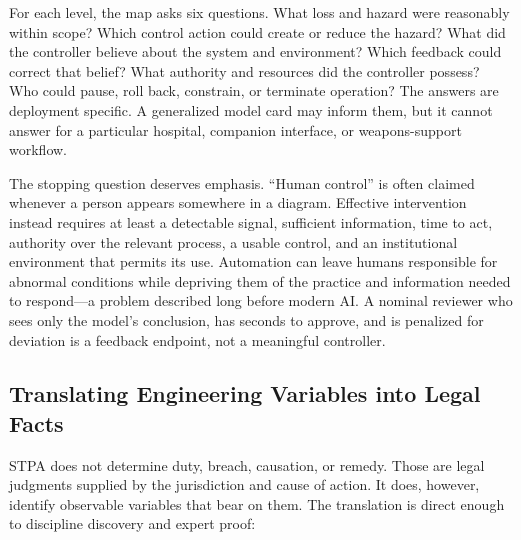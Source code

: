 For each level, the map asks six questions. What loss and hazard were reasonably within scope? Which control action could create or reduce the hazard? What did the controller believe about the system and environment? Which feedback could correct that belief? What authority and resources did the controller possess? Who could pause, roll back, constrain, or terminate operation? The answers are deployment specific. A generalized model card may inform them, but it cannot answer for a particular hospital, companion interface, or weapons-support workflow.

The stopping question deserves emphasis. ``Human control'' is often claimed whenever a person appears somewhere in a diagram. Effective intervention instead requires at least a detectable signal, sufficient information, time to act, authority over the relevant process, a usable control, and an institutional environment that permits its use. Automation can leave humans responsible for abnormal conditions while depriving them of the practice and information needed to respond---a problem described long before modern AI. A nominal reviewer who sees only the model's conclusion, has seconds to approve, and is penalized for deviation is a feedback endpoint, not a meaningful controller.

\subsection{Translating Engineering Variables into Legal Facts}

STPA does not determine duty, breach, causation, or remedy. Those are legal judgments supplied by the jurisdiction and cause of action. It does, however, identify observable variables that bear on them. The translation is direct enough to discipline discovery and expert proof:

